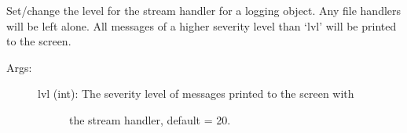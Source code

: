 \documentclass[letterpaper,10pt,english]{sphinxmanual}
\begin{document}
\begin{fulllineitems}

\begin{fulllineitems}
\label{tools:tools.initLogger.CharisLogger.primwarning}
\end{fulllineitems}


\begin{fulllineitems}
\label{tools:tools.initLogger.CharisLogger.setStreamLevel}
Set/change the level for the stream handler for a logging object.
Any file handlers will be left alone.
All messages of a higher severity level than `lvl' will be printed 
to the screen.
\begin{description}
\item[{Args:    }] \leavevmode\begin{description}
\item[{lvl (int): The severity level of messages printed to the screen with }] \leavevmode
the stream handler, default = 20.

\end{description}

\end{description}


\end{fulllineitems}
\end{fulllineitems}
\end{document}
